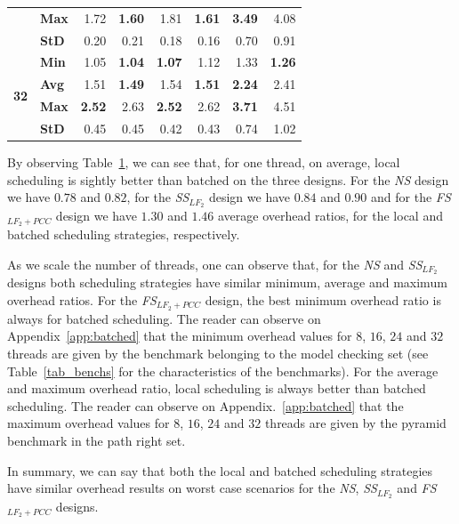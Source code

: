\documentclass{llncs}
\begin{document}
\begin{table}[!ht]
\begin{tabular}{ll|rr|rr|rr}
& {\bf Max }& 1.72& {\bf 1.60}& 1.81& {\bf 1.61}& {\bf 3.49}& 4.08\\
& {\bf StD }& 0.20& 0.21& 0.18& 0.16& 0.70& 0.91\\
\hline
\multirow{4}{*}{\bf 32}
& {\bf Min }& 1.05& {\bf 1.04}& {\bf 1.07}& 1.12& 1.33& {\bf 1.26}\\
& {\bf Avg }& 1.51& {\bf 1.49}& 1.54& {\bf 1.51}& {\bf 2.24}& 2.41\\
& {\bf Max }& {\bf 2.52}& 2.63& {\bf 2.52}& 2.62& {\bf 3.71}& 4.51\\
& {\bf StD }& 0.45& 0.45& 0.42& 0.43& 0.74& 1.02\\
\hline\hline
\end{tabular}%
\label{tab_batched_overhead}
\end{table}

By observing Table~\ref{tab_batched_overhead}, we can see that, for
one thread, on average, local scheduling is sightly better than
batched on the three designs. For the \emph{NS} design we have $0.78$
and $0.82$, for the \emph{SS}$_{LF_2}$ design we have $0.84$ and $0.90$
and for the \emph{FS}$_{LF_2+PCC}$ design we have $1.30$ and $1.46$
average overhead ratios, for the local and batched scheduling
strategies, respectively.

As we scale the number of threads, one can observe that, for the
\emph{NS} and \emph{SS}$_{LF_2}$ designs both scheduling strategies have
similar minimum, average and maximum overhead ratios. For the
\emph{FS}$_{LF_2+PCC}$ design, the best minimum overhead ratio is
always for batched scheduling. The reader can observe on
Appendix~\ref{app:batched} that the minimum overhead values for $8$,
$16$, $24$ and $32$ threads are given by the benchmark belonging to
the model checking set (see Table~\ref{tab_benchs} for the
characteristics of the benchmarks). For the average and maximum
overhead ratio, local scheduling is always better than batched
scheduling. The reader can observe on Appendix.~\ref{app:batched} that
the maximum overhead values for $8$, $16$, $24$ and $32$ threads are
given by the pyramid benchmark in the path right set.

In summary, we can say that both the local and batched scheduling
strategies have similar overhead results on worst case scenarios for
the \emph{NS}, \emph{SS}$_{LF_2}$ and \emph{FS}$_{LF_2+PCC}$ designs. 
\end{document}
